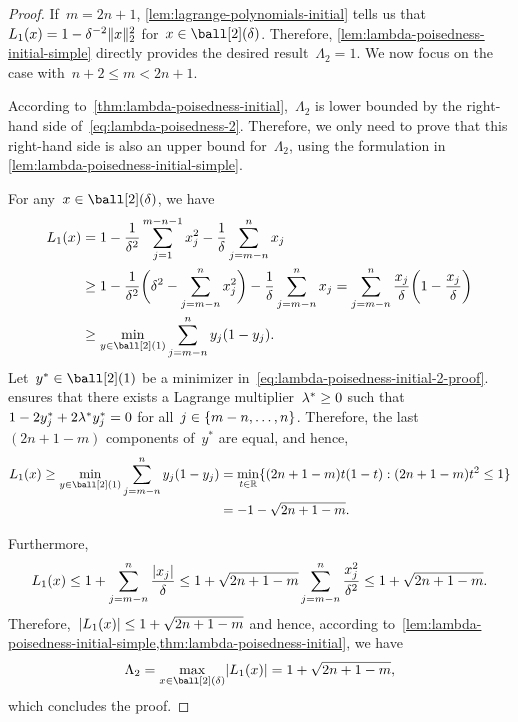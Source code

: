 \begin{proof}
    If~$m = 2n + 1$, \cref{lem:lagrange-polynomials-initial} tells us that~$\lagp[1](\iter) = 1 - \delta^{-2} \norm{x}_2^2$ for~$\iter \in \ball[2](\delta)$.
    Therefore, \cref{lem:lambda-poisedness-initial-simple} directly provides the desired result~$\Lambda_2 = 1$.
    We now focus on the case with~$n + 2 \le m < 2n + 1$.

    According to~\cref{thm:lambda-poisedness-initial},~$\Lambda_2$ is lower bounded by the right-hand side of~\cref{eq:lambda-poisedness-2}.
    Therefore, we only need to prove that this right-hand side is also an upper bound for~$\Lambda_2$, using the formulation in \cref{lem:lambda-poisedness-initial-simple}.
    
    For any~$\iter \in \ball[2](\delta)$, we have
    \begin{subequations}
        \begin{align}
            \lagp[1](\iter) &= 1 - \frac{1}{\delta^2} \sum_{j = 1}^{m - n - 1} x_j^2 - \frac{1}{\delta} \sum_{j = m - n}^n x_j\\
                            &\ge 1 - \frac{1}{\delta^2} \bigg( \delta^2 - \sum_{j = m - n}^n x_j^2 \bigg) - \frac{1}{\delta} \sum_{j = m - n}^n x_j = \sum_{j = m - n}^n \frac{x_j}{\delta} \bigg( 1 - \frac{x_j}{\delta} \bigg)\\
                            &\ge \min_{y \in \ball[2](1)} \sum_{j = m - n}^n y_j (1 - y_j). \label{eq:lambda-poisedness-initial-2-proof}
        \end{align}
    \end{subequations}
    Let~$y^{\ast} \in \ball[2](1)$ be a minimizer in~\cref{eq:lambda-poisedness-initial-2-proof}.
     ensures that there exists a Lagrange multiplier~$\lm[\ast] \ge 0$ such that~$1 - 2 y_j^{\ast} + 2 \lm[\ast] y_j^{\ast} = 0$ for all~$j \in \{m - n, \dots, n\}$.
    Therefore, the last~$(2n + 1 - m)$ components of~$y^{\ast}$ are equal, and hence,
    \begin{align*}
        \lagp[1](\iter) \ge \min_{y \in \ball[2](1)} \sum_{j = m - n}^n y_j (1 - y_j)   &= \min_{t \in \R} \set{(2n + 1 - m) t (1 - t) : (2n + 1 - m) t^2 \le 1}\\
                                                                                    &= -1 - \sqrt{2n + 1 - m}.
    \end{align*}

    Furthermore,
    \begin{equation*}
        \lagp[1](\iter) \le 1 + \sum_{j = m - n}^n \frac{\abs{x_j}}{\delta} \le 1 + \sqrt{2n + 1 - m} \sum_{j = m - n}^n \frac{x_j^2}{\delta^2} \le 1 + \sqrt{2n + 1 - m}.
    \end{equation*}
    Therefore,~$\abs{\lagp[1](\iter)} \le 1 + \sqrt{2n + 1 - m}$ and hence, according to~\cref{lem:lambda-poisedness-initial-simple,thm:lambda-poisedness-initial}, we have
    \begin{equation*}
        \Lambda_2 = \max_{\iter \in \ball[2](\delta)} \abs{\lagp[1](\iter)} = 1 + \sqrt{2n + 1 - m},
    \end{equation*}
    which concludes the proof.
\end{proof}

